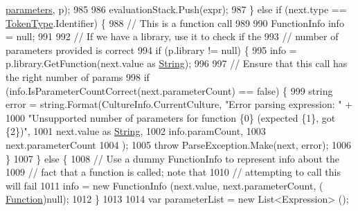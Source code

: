 \begin{DoxyCode}
      \hyperlink{a00106_a7b21380bead8ae08b2cfc6594edab32c}{parameters}, p);
985 
986                         evaluationStack.Push(expr);
987                     \} \textcolor{keywordflow}{else} \textcolor{keywordflow}{if} (next.type == \hyperlink{a00053_a301aa7c866593a5b625a8fc158bbeace}{TokenType}.Identifier) \{
988                         \textcolor{comment}{// This is a function call}
989 
990                         FunctionInfo info = null;
991 
992                         \textcolor{comment}{// If we have a library, use it to check if the}
993                         \textcolor{comment}{// number of parameters provided is correct}
994                         \textcolor{keywordflow}{if} (p.library != null) \{
995                             info = p.library.GetFunction(next.value as \hyperlink{a00053_a301aa7c866593a5b625a8fc158bbeacea27118326006d3829667a400ad23d5d98}{String});
996 
997                             \textcolor{comment}{// Ensure that this call has the right number of params}
998                             \textcolor{keywordflow}{if} (info.IsParameterCountCorrect(next.parameterCount) == \textcolor{keyword}{false}) \{
999                                 \textcolor{keywordtype}{string} error = string.Format(CultureInfo.CurrentCulture, \textcolor{stringliteral}{"Error parsing
       expression: "} +
1000                                     \textcolor{stringliteral}{"Unsupported number of parameters for function \{0\} (expected \{1\}, got
       \{2\})"},
1001                                     next.value as \hyperlink{a00053_a301aa7c866593a5b625a8fc158bbeacea27118326006d3829667a400ad23d5d98}{String},
1002                                     info.paramCount,
1003                                     next.parameterCount
1004                                 );
1005                                 \textcolor{keywordflow}{throw} ParseException.Make(next, error);
1006                             \}
1007                         \} \textcolor{keywordflow}{else} \{
1008                             \textcolor{comment}{// Use a dummy FunctionInfo to represent info about the}
1009                             \textcolor{comment}{// fact that a function is called; note that}
1010                             \textcolor{comment}{// attempting to call this will fail}
1011                             info = \textcolor{keyword}{new} FunctionInfo (next.value, next.parameterCount, (
      \hyperlink{a00053_ae0be2e5cf13d5779816102439e61ff1a}{Function})null);
1012                         \}
1013 
1014                         var parameterList = \textcolor{keyword}{new} List<Expression> ();

\end{DoxyCode}
